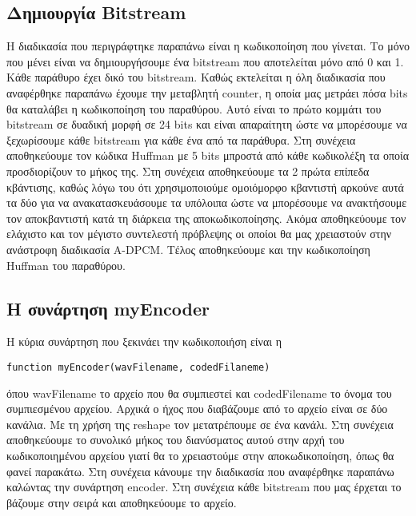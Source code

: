 \subsection{Δημιουργία Bitstream}
\par Η διαδικασία που περιγράφτηκε παραπάνω είναι η κωδικοποίηση που γίνεται. Το
μόνο που μένει είναι να δημιουργήσουμε ένα bitstream που αποτελείται μόνο από 0
και 1. Κάθε παράθυρο έχει δικό του bitstream. Καθώς εκτελείται η όλη διαδικασία
που αναφέρθηκε παραπάνω έχουμε την μεταβλητή counter, η οποία μας μετράει πόσα
bits θα καταλάβει η κωδικοποίηση του παραθύρου. Αυτό είναι το πρώτο κομμάτι του bitstream
σε δυαδική μορφή σε 24 bits και είναι απαραίτητη ώστε να μπορέσουμε να ξεχωρίσουμε
κάθε bitstream για κάθε ένα από τα παράθυρα. Στη συνέχεια αποθηκεύουμε τον κώδικα Huffman
με 5 bits μπροστά από κάθε κωδικολέξη τα οποία προσδιορίζουν το μήκος της. Στη συνέχεια
αποθηκεύουμε τα 2 πρώτα επίπεδα κβάντισης, καθώς λόγω του ότι χρησιμοποιούμε ομοιόμορφο κβαντιστή
αρκούνε αυτά τα δύο για να ανακατασκευάσουμε τα υπόλοιπα ώστε να μπορέσουμε να ανακτήσουμε τον αποκβαντιστή κατά τη
διάρκεια της αποκωδικοποίησης. Ακόμα
αποθηκεύουμε τον ελάχιστο και τον μέγιστο συντελεστή πρόβλεψης οι οποίοι θα μας χρειαστούν
στην ανάστροφη διαδικασία A-DPCM. Τέλος αποθηκεύουμε και την κωδικοποίηση Huffman του
παραθύρου.

\subsection{Η συνάρτηση myEncoder}
\par Η κύρια συνάρτηση που ξεκινάει την κωδικοποιήση είναι η
\begin{lstlisting}[style=MyMatlab]
 function myEncoder(wavFilename, codedFilaneme)
\end{lstlisting}
όπου wavFilename το αρχείο που θα συμπιεστεί και codedFilename το όνομα του
συμπιεσμένου αρχείου. Αρχικά ο ήχος που διαβάζουμε από το αρχείο είναι σε δύο
κανάλια. Με τη χρήση της reshape τον μετατρέπουμε σε ένα κανάλι. Στη συνέχεια
αποθηκεύουμε το συνολικό μήκος του διανύσματος αυτού στην αρχή του κωδικοποιημένου
αρχείου γιατί θα το χρειαστούμε στην αποκωδικοποίηση, όπως θα φανεί παρακάτω. Στη συνέχεια
κάνουμε την διαδικασία που αναφέρθηκε παραπάνω καλώντας την συνάρτηση encoder. Στη συνέχεια
κάθε bitstream που μας έρχεται το βάζουμε στην σειρά και αποθηκεύουμε το αρχείο.


